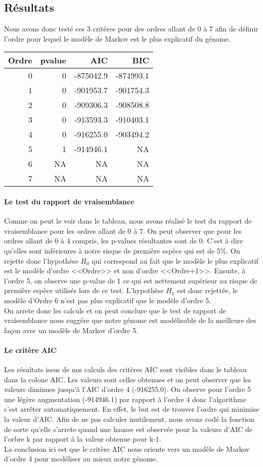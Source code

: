 \documentclass[12pt,a4paper]{article}
\begin{document}
\subsection{Résultats}
Nous avons donc testé ces 3 critères pour des ordres allant de 0 à 7 afin de définir l'ordre pour lequel le modèle de Markov est le plus explicatif du génome.
\begin{table}[!h]
\centering
\begin{tabular}{r|r|r|r}
\hline
Ordre & pvalue & AIC & BIC\\
\hline
0 & 0 & -875042.9 & -874993.1\\
1 & 0 & -901953.7 & -901754.3\\
2 & 0 & -909306.3 & -908508.8\\
3 & 0 & -913593.3 & -910403.1\\
4 & 0 & -916255.0 & -903494.2\\
5 & 1 & -914946.1 & NA\\
6 & NA & NA & NA\\
7 & NA & NA & NA\\
\hline
\end{tabular}
\end{table}
\paragraph{Le test du rapport de vraisemblance}
Comme on peut le voir dans le tableau, nous avons réalisé le test du rapport de vraisemblance pour les ordres allant de 0 à 7.
On peut observer que pour les ordres allant de 0 à 4 compris, les p-values résultantes sont de 0. C'est à dire qu'elles sont inférieures à notre risque de première espèce qui est de 5\%. On rejette donc l'hypothèse $H_0$ qui correspond au fait que le modèle le plus explicatif est le modèle d'ordre <<Ordre>> et non d'ordre <<Ordre+1>>. Ensuite, à l'ordre 5, on observe une p-value de 1 ce qui est nettement supérieur au risque de première espèce utilisés lors de ce test. L'hypothèse $H_1$ est donc rejettée, le modèle d'Ordre 6 n'est pas plus explicatif que le modèle d'ordre 5.
\\ \indent
On arrete donc les calculs et on peut conclure que le test de rapport de vraisemblance nous suggére que notre génome est modélisable de la meilleure des façon avec un modèle de Markov d'ordre 5.
\paragraph{Le critère AIC}
Les résultats issus de nos calculs des critères AIC sont visibles dans le tableau dans la colone AIC. Les valeurs sont celles obtenues et on peut observer que les valeurs diminues jusqu'à l'AIC d'ordre 4 (-916255.0). On observe pour l'ordre 5 une légère augmentation (-914946.1) par rapport à l'ordre 4 donc l'algorithme c'est arrêter automatiquement. En effet, le but est de trouver l'ordre qui minimise la valeur d'AIC. Afin de ne pas calculer inutilement, nous avons codé la fonction de sorte qu'elle s'arrete quand une hausse est observée pour la valeurs d'AIC de l'orbre k par rapport à la valeur obtenue pour k-1.
\\ \indent
La conclusion ici est que le critère AIC nous oriente vers un modèle de Markov d'ordre 4 pour modéliser au mieux notre génome.
\end{document}

